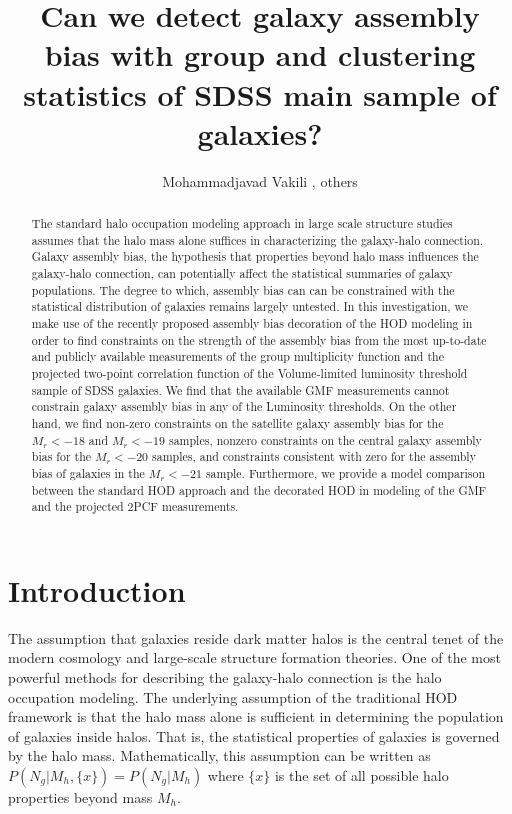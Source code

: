 \documentclass[12pt, preprint]{aastex}
\begin{document}
\title{Can we detect galaxy assembly bias with group and clustering statistics of SDSS main sample of galaxies?}
\author{Mohammadjavad Vakili , others}

\begin{abstract}

The standard halo occupation modeling approach in large scale structure 
studies assumes that the halo mass alone suffices in characterizing the 
galaxy-halo connection. Galaxy assembly bias, the hypothesis that properties beyond 
halo mass influences the galaxy-halo connection, can potentially affect the 
statistical summaries of galaxy populations. The degree to which, assembly bias can 
can be constrained with the statistical distribution of galaxies remains largely 
untested. In this investigation, we make use of the recently proposed assembly bias decoration 
of the HOD modeling in order to find constraints on the strength of the assembly bias from the most up-to-date and publicly available measurements of the group multiplicity function and the projected two-point correlation function of the Volume-limited luminosity threshold sample of SDSS 
galaxies. We find that the available GMF measurements cannot constrain galaxy assembly bias in any of the Luminosity thresholds. On the other hand, we find non-zero constraints on the satellite galaxy assembly bias for the $M_{r}<-18$ and $M_{r}<-19$ samples, nonzero constraints on the central galaxy assembly bias for the $M_{r}<-20$ samples, and constraints consistent with zero for the assembly bias of galaxies in the $M_{r}<-21$ sample. Furthermore, we provide a model comparison between the standard HOD approach and the decorated HOD in modeling of the GMF and the projected 2PCF measurements.

\end{abstract}

\section{Introduction}
The assumption that galaxies reside dark matter halos 
is the central tenet of the modern cosmology and 
large-scale structure formation theories. 
One of the most powerful methods for describing 
the galaxy-halo connection is the halo occupation modeling. 
The underlying assumption of the traditional HOD framework is 
that the halo mass alone is sufficient in determining the
population of galaxies inside halos. That is, the statistical properties of 
galaxies is governed by the halo mass. Mathematically, this assumption can be 
written as $P(N_g|M_h,\{x\})=P(N_g|M_h)$ where $\{x\}$ is the set of all 
possible halo properties beyond mass $M_{h}$. 
\end{document}
